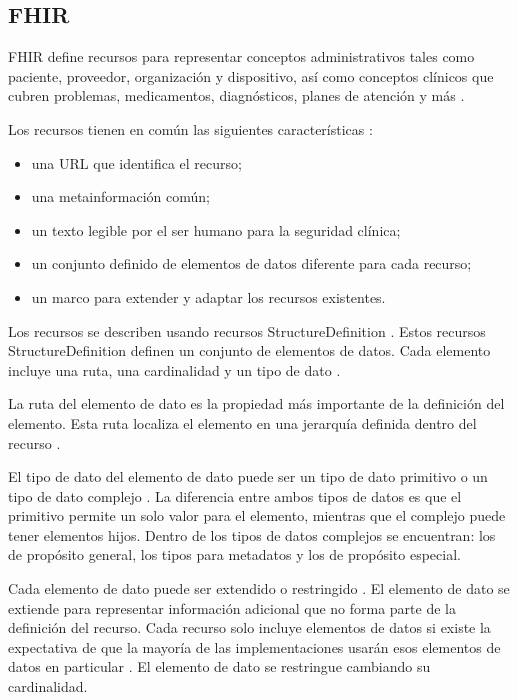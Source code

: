 \subsection{FHIR}

FHIR define recursos para representar conceptos administrativos tales como paciente, proveedor, organización y dispositivo, así como conceptos clínicos que cubren problemas, medicamentos, diagnósticos, planes de atención y más \cite{FHIRResourceList}.

Los recursos tienen en común las siguientes características \cite{FHIRDeveloper}:
\begin{itemize}
  \item una URL que identifica el recurso;
  \item una metainformación común;
  \item un texto legible por el ser humano para la seguridad clínica;
  \item un conjunto definido de elementos de datos diferente para cada recurso;
  \item un marco para extender y adaptar los recursos existentes.
\end{itemize}

Los recursos se describen usando recursos StructureDefinition \cite{FHIRStructureDefinition}. Estos recursos StructureDefinition definen un conjunto de elementos de datos. Cada elemento incluye una ruta, una cardinalidad y un tipo de dato \cite{FHIRElementDefinition}.

La ruta del elemento de dato es la propiedad más importante de la definición del elemento. Esta ruta localiza el elemento en una jerarquía definida dentro del recurso \cite{FHIRElementDefinition}.

El tipo de dato del elemento de dato puede ser un tipo de dato primitivo o un tipo de dato complejo \cite{FHIRDataTypes}. La diferencia entre ambos tipos de datos es que el primitivo permite un solo valor para el elemento,  mientras que el complejo puede tener elementos hijos. Dentro de los tipos de datos complejos se encuentran: los de propósito general,  los tipos para metadatos y los de propósito especial.

Cada elemento de dato puede ser extendido o restringido \cite{FHIRProfiling}. El elemento de dato se extiende para representar información adicional que no forma parte de la definición del recurso\cite{FHIRExtensibility}. Cada recurso solo incluye elementos de datos si existe la expectativa de que la mayoría de las implementaciones usarán esos elementos de datos en particular \cite{FHIRArchitecture}. El elemento de dato se restringue cambiando su cardinalidad.

